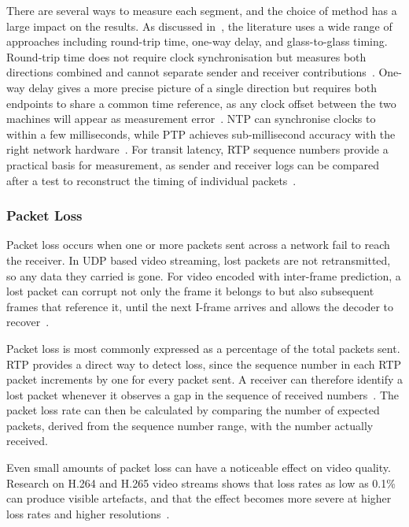 There are several ways to measure each segment, and the choice of method has a large impact on the results. As discussed in~\cite{myhrvold2025}, the literature uses a wide range of approaches including round-trip time, one-way delay, and glass-to-glass timing. Round-trip time does not require clock synchronisation but measures both directions combined and cannot separate sender and receiver contributions~\cite{rfc3550}. One-way delay gives a more precise picture of a single direction but requires both endpoints to share a common time reference, as any clock offset between the two machines will appear as measurement error~\cite{kaknjo2018}. NTP can synchronise clocks to within a few milliseconds, while PTP achieves sub-millisecond accuracy with the right network hardware~\cite{rfc3550}. For transit latency, RTP sequence numbers provide a practical basis for measurement, as sender and receiver logs can be compared after a test to reconstruct the timing of individual packets~\cite{rfc3550}.

\subsubsection{Packet Loss}\label{subsec:packet-loss}
Packet loss occurs when one or more packets sent across a network fail to reach the receiver. In UDP based video streaming, lost packets are not retransmitted, so any data they carried is gone. For video encoded with inter-frame prediction, a lost packet can corrupt not only the frame it belongs to but also subsequent frames that reference it, until the next I-frame arrives and allows the decoder to recover~\cite{calyam2012}.
 
Packet loss is most commonly expressed as a percentage of the total packets sent. RTP provides a direct way to detect loss, since the sequence number in each RTP packet increments by one for every packet sent. A receiver can therefore identify a lost packet whenever it observes a gap in the sequence of received numbers~\cite{rfc3550}. The packet loss rate can then be calculated by comparing the number of expected packets, derived from the sequence number range, with the number actually received.
 
Even small amounts of packet loss can have a noticeable effect on video quality. Research on H.264 and H.265 video streams shows that loss rates as low as 0.1\% can produce visible artefacts, and that the effect becomes more severe at higher loss rates and higher resolutions~\cite{pekec2023}.
 
